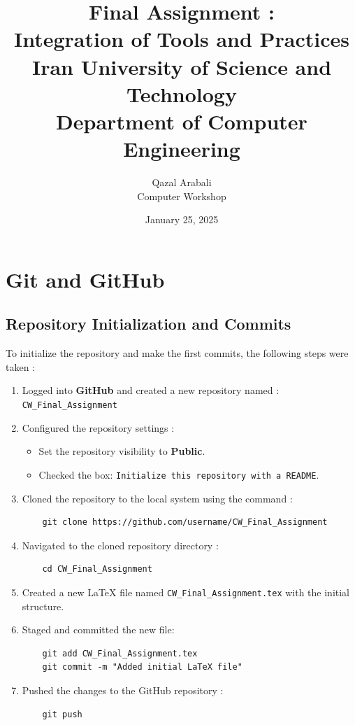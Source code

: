 \documentclass[12pt]{article}
\title{
    \vspace{2in}
    \textbf{Final Assignment :}\\
    \textbf{Integration of Tools and Practices}\\
    \large Iran University of Science and Technology\\
    \large Department of Computer Engineering\\
    \vspace{2in}
}
\author{
    \vspace{0.5in}
    Qazal Arabali\\
    Computer Workshop\\
    \vspace{0.5in}
}
\date{January 25, 2025}
\begin{document}
\begin{titlepage}
    \maketitle
    \thispagestyle{empty}
\end{titlepage}

\newpage

\tableofcontents
\newpage

\section{Git and GitHub}
    \subsection{Repository Initialization and Commits}
    
To initialize the repository and make the first commits, the following steps were taken :

\begin{enumerate}
    \item Logged into \textbf{GitHub} and created a new repository named :
    \texttt{CW\_Final\_Assignment}
    
    \item Configured the repository settings :
    \begin{itemize}
        \item Set the repository visibility to \textbf{Public}.
        \item Checked the box: \texttt{Initialize this repository with a README}.
    \end{itemize}

    \item Cloned the repository to the local system using the command :
    \begin{lstlisting}
    git clone https://github.com/username/CW_Final_Assignment
    \end{lstlisting}

    \item Navigated to the cloned repository directory :
    \begin{lstlisting}
    cd CW_Final_Assignment
    \end{lstlisting}

    \item Created a new LaTeX file named \texttt{CW\_Final\_Assignment.tex} with the initial structure.

    \item Staged and committed the new file:
    \begin{lstlisting}
    git add CW_Final_Assignment.tex
    git commit -m "Added initial LaTeX file"
    \end{lstlisting}

    \item Pushed the changes to the GitHub repository :
    \begin{lstlisting}
    git push
    \end{lstlisting}
\end{enumerate}
\end{document}
